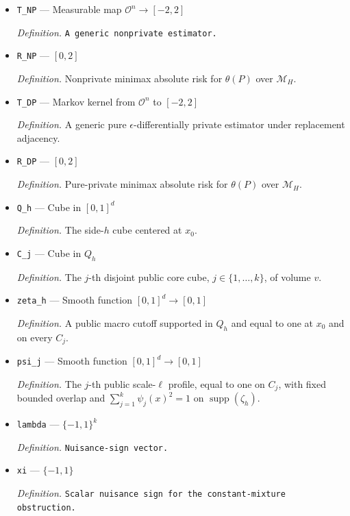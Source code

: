 \documentclass{article}
\begin{document}
\begin{itemize}
  \item \texttt{T\_\allowbreak{}NP} --- Measurable map \(\mathcal O^n\to[-2,2]\)
  \par\smallskip\noindent\emph{Definition.} \texttt{A generic nonprivate estimator.}
  \item \texttt{R\_\allowbreak{}NP} --- \([0,2]\)
  \par\smallskip\noindent\emph{Definition.} Nonprivate minimax absolute risk for \(\theta(P)\) over \(\mathcal M_H\).
  \item \texttt{T\_\allowbreak{}DP} --- Markov kernel from \(\mathcal O^n\) to \([-2,2]\)
  \par\smallskip\noindent\emph{Definition.} A generic pure \(\epsilon\)-differentially private estimator under replacement adjacency.
  \item \texttt{R\_\allowbreak{}DP} --- \([0,2]\)
  \par\smallskip\noindent\emph{Definition.} Pure-private minimax absolute risk for \(\theta(P)\) over \(\mathcal M_H\).
  \item \texttt{Q\_\allowbreak{}h} --- Cube in \([0,1]^d\)
  \par\smallskip\noindent\emph{Definition.} The side-\(h\) cube centered at \(x_0\).
  \item \texttt{C\_\allowbreak{}j} --- Cube in \(Q_h\)
  \par\smallskip\noindent\emph{Definition.} The \(j\)-th disjoint public core cube, \(j\in\{1,\ldots,k\}\), of volume \(v\).
  \item \texttt{zeta\_\allowbreak{}h} --- Smooth function \([0,1]^d\to[0,1]\)
  \par\smallskip\noindent\emph{Definition.} A public macro cutoff supported in \(Q_h\) and equal to one at \(x_0\) and on every \(C_j\).
  \item \texttt{psi\_\allowbreak{}j} --- Smooth function \([0,1]^d\to[0,1]\)
  \par\smallskip\noindent\emph{Definition.} The \(j\)-th public scale-\(\ell\) profile, equal to one on \(C_j\), with fixed bounded overlap and \(\sum_{j=1}^k\psi_j(x)^2=1\) on \(\operatorname{supp}(\zeta_h)\).
  \item \texttt{lambda} --- \(\{-1,1\}^k\)
  \par\smallskip\noindent\emph{Definition.} \texttt{Nuisance-\allowbreak{}sign vector.}
  \item \texttt{xi} --- \(\{-1,1\}\)
  \par\smallskip\noindent\emph{Definition.} \texttt{Scalar nuisance sign for the constant-\allowbreak{}mixture obstruction.}

\end{itemize}
\end{document}
